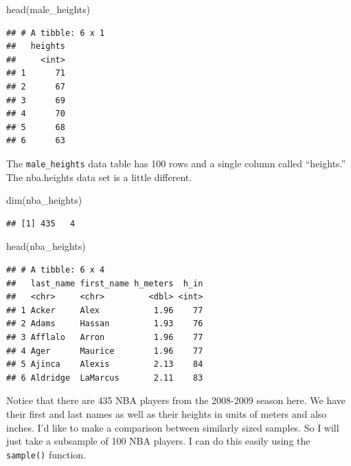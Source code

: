 \documentclass[
  openany]{book}
\newenvironment{Shaded}{\begin{snugshade}}{\end{snugshade}}
\newcommand{\CommentTok}[1]{\textcolor[rgb]{0.56,0.35,0.01}{\textit{#1}}}
\newcommand{\DecValTok}[1]{\textcolor[rgb]{0.00,0.00,0.81}{#1}}
\newcommand{\FunctionTok}[1]{\textcolor[rgb]{0.00,0.00,0.00}{#1}}
\newcommand{\NormalTok}[1]{#1}
\newcommand{\OtherTok}[1]{\textcolor[rgb]{0.56,0.35,0.01}{#1}}
\newcommand{\SpecialCharTok}[1]{\textcolor[rgb]{0.00,0.00,0.00}{#1}}
\begin{document}
\begin{Shaded}
\begin{Highlighting}[]
\FunctionTok{head}\NormalTok{(male\_heights)}
\end{Highlighting}
\end{Shaded}

\begin{verbatim}
## # A tibble: 6 x 1
##   heights
##     <int>
## 1      71
## 2      67
## 3      69
## 4      70
## 5      68
## 6      63
\end{verbatim}

The \texttt{male\_heights} data table has 100 rows and a single column called ``heights.'' The nba.heights data set is a little different.

\begin{Shaded}
\begin{Highlighting}[]
\FunctionTok{dim}\NormalTok{(nba\_heights)}
\end{Highlighting}
\end{Shaded}

\begin{verbatim}
## [1] 435   4
\end{verbatim}

\begin{Shaded}
\begin{Highlighting}[]
\FunctionTok{head}\NormalTok{(nba\_heights)}
\end{Highlighting}
\end{Shaded}

\begin{verbatim}
## # A tibble: 6 x 4
##   last_name first_name h_meters  h_in
##   <chr>     <chr>         <dbl> <int>
## 1 Acker     Alex           1.96    77
## 2 Adams     Hassan         1.93    76
## 3 Afflalo   Arron          1.96    77
## 4 Ager      Maurice        1.96    77
## 5 Ajinca    Alexis         2.13    84
## 6 Aldridge  LaMarcus       2.11    83
\end{verbatim}

Notice that there are 435 NBA players from the 2008-2009 season here. We have their first and last names as well as their heights in units of meters and also inches. I'd like to make a comparison between similarly sized samples. So I will just take a subsample of 100 NBA players. I can do this easily using the \texttt{sample()} function.

\begin{Shaded}
\end{Shaded}
\end{document}
